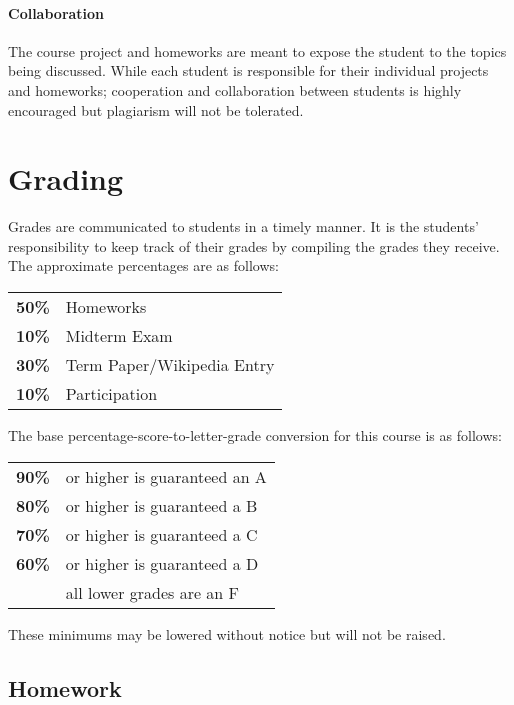 \documentclass[12pt]{scrartcl}
\begin{document}
\paragraph{Collaboration} 
The course project and homeworks are meant to expose the student to the topics being discussed. 
While each student is responsible for their individual projects and homeworks; 
cooperation and collaboration between students is highly encouraged but plagiarism will not be tolerated.

\section{Grading}

Grades are communicated to students in a timely manner. 
It is the students’ responsibility to keep track of their grades by compiling the grades they receive. 
The approximate percentages are as follows:
\begin{center}
\begin{tabular}{rl}
\textbf{50\% } & Homeworks\\
\textbf{10\% } & Midterm Exam\\
\textbf{30\% } & Term Paper/Wikipedia Entry \\
\textbf{10\% } & Participation\\
\end{tabular}
\end{center}

The base percentage-score-to-letter-grade conversion for this course is as follows: 
\begin{center}
\begin{tabular}{rl}
\textbf{90\%}& or higher is guaranteed an A \\
\textbf{80\%}& or higher is guaranteed a B \\
\textbf{70\%}& or higher is guaranteed a C \\
\textbf{60\%}& or higher is guaranteed a D \\
\textbf{}& all lower grades are an F 
\end{tabular}
\end{center}
These minimums may be lowered without notice but will not be raised. 


\subsection{Homework }
\end{document}

